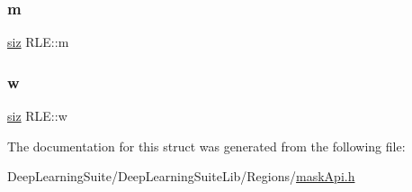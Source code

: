 \mbox{\label{struct_r_l_e_afc79c7bf9f98a42ca3c9f831042b9eee}} 
\subsubsection{\texorpdfstring{m}{m}}
{\footnotesize\ttfamily \hyperlink{mask_api_8h_aa6f8bea7f64712768a7b9a4acc9601bf}{siz} R\+L\+E\+::m}

\mbox{\label{struct_r_l_e_ad5eb7382229117c8f368a2482711f540}} 
\subsubsection{\texorpdfstring{w}{w}}
{\footnotesize\ttfamily \hyperlink{mask_api_8h_aa6f8bea7f64712768a7b9a4acc9601bf}{siz} R\+L\+E\+::w}



The documentation for this struct was generated from the following file\+:\begin{DoxyCompactItemize}
\item 
Deep\+Learning\+Suite/\+Deep\+Learning\+Suite\+Lib/\+Regions/\hyperlink{mask_api_8h}{mask\+Api.\+h}\end{DoxyCompactItemize}
